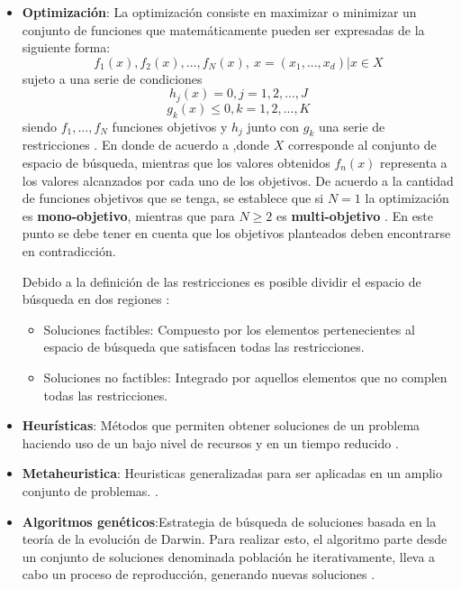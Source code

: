 \documentclass[11pt,letterpaper]{article}
\begin{document}
\begin{itemize}
\item \textbf{Optimización}: La optimización consiste en maximizar o minimizar un conjunto de funciones que matemáticamente pueden ser expresadas de la siguiente forma:
$$f_1(x),f_2(x), ..., f_N(x),\ x=(x_1,...,x_d) | x \in X$$
sujeto a una serie de condiciones
$$h_j(x) = 0, j=1,2,...,J$$
$$g_k(x) \leq 0, k=1,2,...,K$$
siendo $f_1,...,f_N$ funciones objetivos y   $h_j$ junto con $g_k$ una serie de restricciones \cite{Yang2015}. En donde de acuerdo a \cite{Lopez2013},donde $X$ corresponde al conjunto de espacio de búsqueda, mientras que los valores obtenidos $f_n(x)$ representa a los valores alcanzados por cada uno de los objetivos. De acuerdo a la cantidad de funciones objetivos que se tenga, se establece que si $N=1$ la optimización es \textbf{mono-objetivo}, mientras que para $N\geq 2$ es \textbf{multi-objetivo} \cite{Yang2015}. En este punto se debe tener en cuenta que los objetivos planteados deben encontrarse en contradicción. 

Debido a la definición de las restricciones es posible dividir el espacio de búsqueda en dos regiones \cite{Lopez2013}:
\begin{itemize}
	\item Soluciones factibles: Compuesto por los elementos pertenecientes al espacio de búsqueda que satisfacen todas las restricciones.
	\item Soluciones no factibles: Integrado por aquellos elementos que no complen todas las restricciones.
\end{itemize}


\item \textbf{Heurísticas}: Métodos que permiten obtener soluciones de un problema haciendo uso de un bajo nivel de recursos y en un tiempo reducido \cite{Lopez2013}.


\item \textbf{Metaheuristica}: Heuristicas generalizadas para ser aplicadas en un amplio conjunto de problemas. \cite{Lopez2013}.

\item \textbf{Algoritmos genéticos}:Estrategia de búsqueda de soluciones basada en la teoría de la evolución de Darwin. Para realizar esto, el algoritmo  parte desde un conjunto de soluciones denominada población he iterativamente, lleva a cabo un proceso de reproducción, generando nuevas soluciones \cite{Heiss-Czedik1997}.


\end{itemize}
\end{document}
